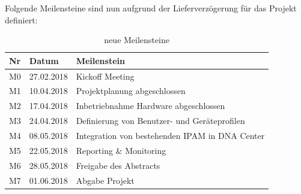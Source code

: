 Folgende Meilensteine sind nun aufgrund der Lieferverzögerung für das Projekt definiert:
\begin{table}[H]
	\centering
	\begin{tabularx}{\textwidth}{p{1cm}| p{2.5cm}| X}
		\rowcolor{gray!50}
		\textbf{Nr} & \textbf{Datum} & \textbf{Meilenstein} \\
		\hline	
		M0 & 27.02.2018 & Kickoff Meeting \\
		M1 & 10.04.2018 & Projektplanung abgeschlossen \\
		M2 & 17.04.2018 & Inbetriebnahme Hardware abgeschlossen \\
		M3 & 24.04.2018 & Definierung von Benutzer- und Geräteprofilen \\
		M4 & 08.05.2018 & Integration von bestehenden IPAM in DNA Center \\
		M5 & 22.05.2018 & Reporting \& Monitoring \\
		M6 & 28.05.2018 & Freigabe des Abstracts \\
		M7 & 01.06.2018 & Abgabe Projekt \\
	\end{tabularx}
	\caption{neue Meilensteine}
	\label{tab:neue Meilensteine}
\end{table}

